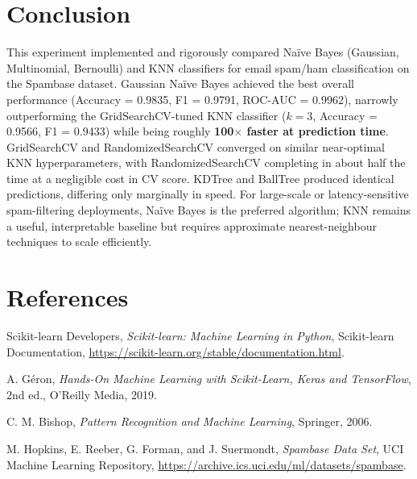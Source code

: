 \documentclass[12pt,a4paper]{article}
\begin{document}
\section{Conclusion}
This experiment implemented and rigorously compared Na\"ive Bayes (Gaussian, Multinomial, Bernoulli) and KNN classifiers for email spam/ham classification on the Spambase dataset. Gaussian Na\"ive Bayes achieved the best overall performance (Accuracy = 0.9835, F1 = 0.9791, ROC-AUC = 0.9962), narrowly outperforming the GridSearchCV-tuned KNN classifier ($k=3$, Accuracy = 0.9566, F1 = 0.9433) while being roughly \textbf{100$\times$ faster at prediction time}. GridSearchCV and RandomizedSearchCV converged on similar near-optimal KNN hyperparameters, with RandomizedSearchCV completing in about half the time at a negligible cost in CV score. KDTree and BallTree produced identical predictions, differing only marginally in speed. For large-scale or latency-sensitive spam-filtering deployments, Na\"ive Bayes is the preferred algorithm; KNN remains a useful, interpretable baseline but requires approximate nearest-neighbour techniques to scale efficiently.

\section{References}
\begin{enumerate}[label={[\arabic*]}]
\item Scikit-learn Developers, \emph{Scikit-learn: Machine Learning in Python}, Scikit-learn Documentation, \url{https://scikit-learn.org/stable/documentation.html}.
\item A. G\'eron, \emph{Hands-On Machine Learning with Scikit-Learn, Keras and TensorFlow}, 2nd ed., O'Reilly Media, 2019.
\item C. M. Bishop, \emph{Pattern Recognition and Machine Learning}, Springer, 2006.
\item M. Hopkins, E. Reeber, G. Forman, and J. Suermondt, \emph{Spambase Data Set}, UCI Machine Learning Repository, \url{https://archive.ics.uci.edu/ml/datasets/spambase}.
\end{enumerate}
\end{document}
